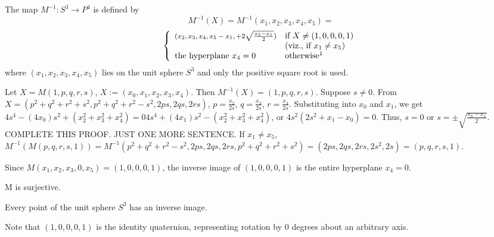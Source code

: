 \begin{lemma}
\label{lem:invM}
The map $M^{-1}:S^3 \rightarrow P^4$ is defined by
\begin{equation}
\label{eq:invM}
M^{-1}(X) = M^{-1}(x_1,x_2,x_3,x_4,x_5)=
\end{equation}
\[
\left\{ \begin{array}{ll}
\mbox{\footnotesize{$(x_2,x_3,x_4,x_5-x_1,+2\sqrt{\frac{x_5-x_1}{2}})$}}
	& \mbox{if } X \neq (1,0,0,0,1) \\
	& \mbox{(viz., if } x_1 \neq x_5 \mbox{)} \\
\mbox{the hyperplane } x_4 = 0 
	& \mbox{otherwise\footnotemark}
\end{array} \right.
\]
where $(x_1,x_2,x_3,x_4,x_5)$ lies on the unit sphere $S^3$
and only the positive square root is used.
\end{lemma}
\prf
\ifFull
Let $X = M(1,p,q,r,s)$, $X := (x_0,x_1,x_2,x_3,x_4)$.
Then $M^{-1}(X) = (1,p,q,r,s)$.
Suppose $s \neq 0$.
From $X = (p^2+q^2+r^2+s^2, p^2+q^2+r^2-s^2, 2ps, 2qs, 2rs)$,
$p = \frac{x_2}{2s}$, $q = \frac{x_3}{2s}$, $r = \frac{x_4}{2s}$.
Substituting into $x_0$ and $x_1$, we get 
$ 4s^4 - (4x_0)s^2 + (x_2^2 + x_3^2 + x_4^2) = 0
4s^4 + (4x_1)s^2 - (x_2^2 + x_3^2 + x_4^2)$,
or $4s^2(2s^2+ x_1 - x_0) = 0$.
Thus, $s=0$ or $s = \pm \sqrt{\frac{x_0 -x_1}{2}}$.
COMPLETE THIS PROOF.  JUST ONE MORE SENTENCE.
\fi
If $x_1 \neq x_5$,
$M^{-1}(M(p,q,r,s,1)) = 
 M^{-1}(p^2+q^2+r^2-s^2,2ps,2qs,2rs,p^2+q^2+r^2+s^2) = 
 (2ps,2qs,2rs,2s^2,2s) = 
 (p,q,r,s,1)$.

Since $M(x_1,x_2,x_3,0,x_5) = (1,0,0,0,1)$, the inverse image
of $(1,0,0,0,1)$ is the entire hyperplane $x_4=0$.
\QED

\begin{corollary}
M is surjective.
\end{corollary}
\prf
Every point of the unit sphere $S^3$ has an inverse image.
\QED

Note that $(1,0,0,0,1)$ is the identity quaternion, representing rotation by
0 degrees about an arbitrary axis.


